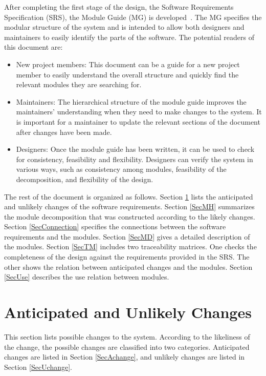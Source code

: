 \documentclass[12pt, titlepage]{article}
\begin{document}
After completing the first stage of the design, the Software Requirements
Specification (SRS), the Module Guide (MG) is developed~\citep{ParnasEtAl1984}. The MG
specifies the modular structure of the system and is intended to allow both
designers and maintainers to easily identify the parts of the software.  The
potential readers of this document are:

\begin{itemize}
\item New project members: This document can be a guide for a new project member
  to easily understand the overall structure and quickly find the
  relevant modules they are searching for.
\item Maintainers: The hierarchical structure of the module guide improves the
  maintainers' understanding when they need to make changes to the system. It is
  important for a maintainer to update the relevant sections of the document
  after changes have been made.
\item Designers: Once the module guide has been written, it can be used to
  check for consistency, feasibility and flexibility. Designers can verify the
  system in various ways, such as consistency among modules, feasibility of the
  decomposition, and flexibility of the design.
\end{itemize}

The rest of the document is organized as follows. Section
\ref{SecChange} lists the anticipated and unlikely changes of the software
requirements. Section \ref{SecMH} summarizes the module decomposition that
was constructed according to the likely changes. Section \ref{SecConnection}
specifies the connections between the software requirements and the
modules. Section \ref{SecMD} gives a detailed description of the
modules. Section \ref{SecTM} includes two traceability matrices. One checks
the completeness of the design against the requirements provided in the SRS. The
other shows the relation between anticipated changes and the modules. Section
\ref{SecUse} describes the use relation between modules.

\section{Anticipated and Unlikely Changes} \label{SecChange}

This section lists possible changes to the system. According to the likeliness
of the change, the possible changes are classified into two
categories. Anticipated changes are listed in Section \ref{SecAchange}, and
unlikely changes are listed in Section \ref{SecUchange}.
\end{document}
